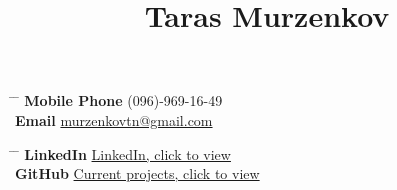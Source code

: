 \documentclass[10pt]{article} %
\begin{document}


\title{Taras Murzenkov } %


\parbox{0.2\textwidth}{ %
\begin{tabbing} %
\hspace{3cm} \= \hspace{4cm} \= \kill %
{\bf Mobile Phone} \> (096)-969-16-49\\ %
{\bf Email} \> \href{mailto:murzenkovtn@gmail.com}{murzenkovtn@gmail.com} \\ %

\end{tabbing}}
\hfill %
\parbox{0.5\textwidth}{ %
\begin{tabbing} %
\hspace{3cm} \= \hspace{4cm} \= \kill %
{\bf LinkedIn} \> \href{https://www.linkedin.com/in/tarasmurzenkov}{LinkedIn, click to view} \\ %
{\bf GitHub} \> \href{https://github.com/tarasmurzenkov/}{Current projects, click to view}\\ %

\end{tabbing}}

\end{document}
